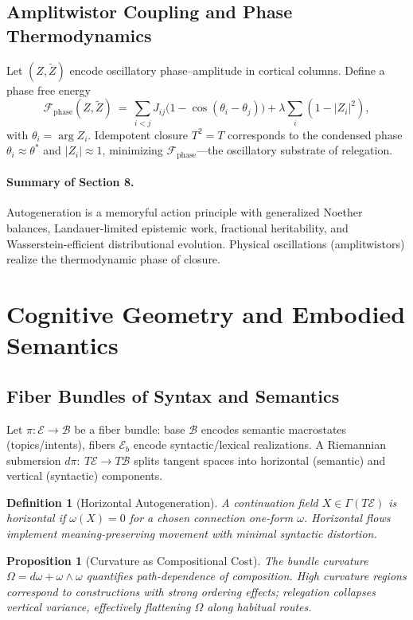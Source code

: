\documentclass[12pt,a4paper,twoside,openright]{book}
\newtheorem{proposition}[theorem]{Proposition}
\newtheorem{definition}[theorem]{Definition}
\begin{document}
\subsection{Amplitwistor Coupling and Phase Thermodynamics}
Let $(Z,\tilde Z)$ encode oscillatory phase–amplitude in cortical columns.
Define a phase free energy
\begin{equation}
\mathcal{F}_{\mathrm{phase}}(Z,\tilde Z)\ =\ \sum_{i<j} J_{ij}\big(1-\cos(\theta_i-\theta_j)\big) + \lambda\sum_i(1-|Z_i|^2),
\end{equation}
with $\theta_i=\arg Z_i$.
Idempotent closure $T^2=T$ corresponds to the condensed phase $\theta_i\approx \theta^\ast$ and $|Z_i|\approx 1$, minimizing $\mathcal{F}_{\mathrm{phase}}$—the oscillatory substrate of relegation.

\paragraph{Summary of Section 8.}
Autogeneration is a memoryful action principle with generalized Noether balances, Landauer-limited epistemic work, fractional heritability, and Wasserstein-efficient distributional evolution.
Physical oscillations (amplitwistors) realize the thermodynamic phase of closure.

\section{Cognitive Geometry and Embodied Semantics}
\subsection{Fiber Bundles of Syntax and Semantics}
Let $\pi:\mathcal{E}\to\mathcal{B}$ be a fiber bundle: base $\mathcal{B}$ encodes semantic macrostates (topics/intents), fibers $\mathcal{E}_b$ encode syntactic/lexical realizations.
A Riemannian submersion $d\pi:\ T\mathcal{E}\to T\mathcal{B}$ splits tangent spaces into horizontal (semantic) and vertical (syntactic) components.

\begin{definition}[Horizontal Autogeneration]
A continuation field $X\in\Gamma(T\mathcal{E})$ is \emph{horizontal} if $\omega(X)=0$ for a chosen connection one-form $\omega$.
Horizontal flows implement meaning-preserving movement with minimal syntactic distortion.
\end{definition}

\begin{proposition}[Curvature as Compositional Cost]
The bundle curvature $\Omega=d\omega+\omega\wedge\omega$ quantifies path-dependence of composition.
High curvature regions correspond to constructions with strong ordering effects; relegation collapses vertical variance, effectively flattening $\Omega$ along habitual routes.
\end{proposition}
\end{document}
